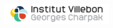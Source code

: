 \documentclass[11pt]{article} %
\begin{document}

\begin{figure}[H]
\centering\includegraphics[width=0.5\textwidth]{./assets_latex/logoVillebon.jpg}
\end{figure}

\end{document}
